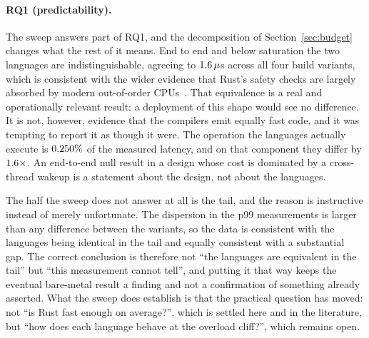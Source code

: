 \documentclass[english,twoside,openright,a4paper,censored,csm,software-track-2020]{HYthesisML}
\begin{document}
\paragraph{RQ1 (predictability).} The sweep answers part of RQ1, and the decomposition of
Section~\ref{sec:budget} changes what the rest of it means. End to end and below saturation the
two languages are indistinguishable, agreeing to $1.6\,\mu$s across all four build
variants, which is consistent with the wider evidence that Rust's safety checks are largely
absorbed by modern out-of-order CPUs~\cite{emmerich2019drivers,balasubramanian2017rust}. That
equivalence is a real and operationally relevant result: a deployment of this shape would see
no difference. It is not, however, evidence that the compilers emit equally fast code, and it
was tempting to report it as though it were. The operation the languages actually execute is
$0.250\%$ of the measured latency, and on that component they differ by
$1.6\times$. An end-to-end null result in a design whose cost is dominated by a
cross-thread wakeup is a statement about the design, not about the languages.

The half the sweep does not answer at all is the tail, and the reason is instructive instead of
merely unfortunate. The dispersion in the p99 measurements is larger than any difference between
the
variants, so the data is consistent with the languages being identical in the tail and equally
consistent with a substantial gap. The correct conclusion is therefore not ``the languages are
equivalent in the tail'' but ``this measurement cannot tell'', and putting it that way keeps the
eventual bare-metal result a finding and not a confirmation of something already
asserted. What the sweep does establish is that the practical question has moved: not ``is Rust
fast enough on average?'', which is settled here and in the literature, but ``how does each
language behave at the overload cliff?'', which remains open.
\end{document}
